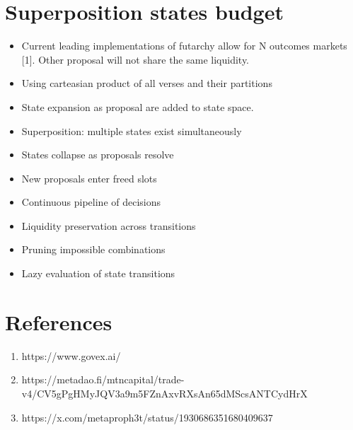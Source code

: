 \documentclass{article}
\begin{document}
\section{Superposition states budget}
\begin{itemize}
    \item Current leading implementations of futarchy allow for N outcomes markets [1]. Other proposal will not share the same liquidity.
    \item Using carteasian product of all verses and their partitions
    \item State expansion as proposal are added to state space.
    \item Superposition: multiple states exist simultaneously
    \item States collapse as proposals resolve
    \item New proposals enter freed slots
    \item Continuous pipeline of decisions
    \item Liquidity preservation across transitions
    \item Pruning impossible combinations
    \item Lazy evaluation of state transitions
\end{itemize}

\section{References}
\begin{enumerate}
   \item https://www.govex.ai/
   \item https://metadao.fi/mtncapital/trade-v4/CV5gPgHMyJQV3a9m5FZnAxvRXsAn65dMScsANTCydHrX
   \item https://x.com/metaproph3t/status/1930686351680409637
\end{enumerate}
\end{document}
